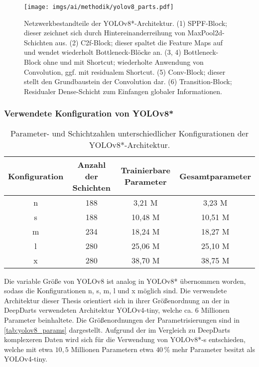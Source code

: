 \begin{figure}
    \centering
    \texttt{[image: imgs/ai/methodik/yolov8\_parts.pdf]}
    \caption{Netzwerkbestandteile der YOLOv8*-Architektur. (1) SPPF-Block; dieser zeichnet sich durch Hintereinanderreihung von MaxPool2d-Schichten aus. (2) C2f-Block; dieser spaltet die Feature Maps auf und wendet wiederholt Bottleneck-Blöcke an. (3, 4) Bottleneck-Block ohne und mit Shortcut; wiederholte Anwendung von Convolution, ggf. mit residualem Shortcut. (5) Conv-Block; dieser stellt den Grundbaustein der Convolution dar. (6) Transition-Block; Residualer Dense-Schicht zum Einfangen globaler Informationen.}
    \label{img:yolov8_parts}
\end{figure}

\vspace*{-0.1cm}
\subsubsection{Verwendete Konfiguration von YOLOv8*}
\label{sec:yolov8_konfiguration}

\begin{table}[t]
    \begin{tabular}{c||c|c|c}
        Konfiguration & Anzahl der Schichten & Trainierbare Parameter & Gesamtparameter \\ \hline
        n             & 188                  & 3,21 M                 & 3,23 M          \\
        s             & 188                  & 10,48 M                & 10,51 M         \\
        m             & 234                  & 18,24 M                & 18,27 M         \\
        l             & 280                  & 25,06 M                & 25,10 M         \\
        x             & 280                  & 38,70 M                & 38,75 M
    \end{tabular}
    \caption{Parameter- und Schichtzahlen unterschiedlicher Konfigurationen der YOLOv8*-Architektur.}
    \label{tab:yolov8_params}
\end{table}

Die variable Größe von YOLOv8 ist analog in YOLOv8* übernommen worden, sodass die Konfigurationen n, s, m, l und x möglich sind. Die verwendete Architektur dieser Thesis orientiert sich in ihrer Größenordnung an der in DeepDarts verwendeten Architektur YOLOv4-tiny, welche ca. $6$ Millionen Parameter beinhaltete. Die Größenordnungen der Parametrisierungen sind in \autoref{tab:yolov8_params} dargestellt. Aufgrund der im Vergleich zu DeepDarts komplexeren Daten wird sich für die Verwendung von YOLOv8*-s entschieden, welche mit etwa $10,\!5$ Millionen Parametern etwa $40\,\%$ mehr Parameter besitzt als YOLOv4-tiny.

